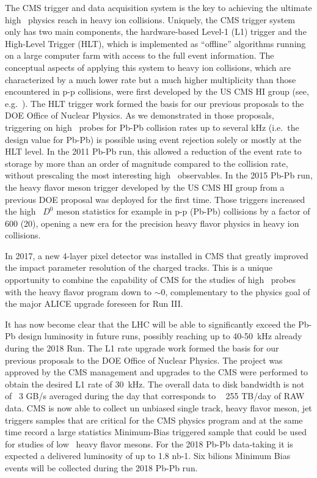 The CMS trigger and data acquisition system is the key to achieving the ultimate high \pt\ physics reach in heavy ion collisions. Uniquely, the CMS trigger system only has two main components, the hardware-based Level-1 (L1) trigger and the High-Level Trigger (HLT), which is implemented as ``offline'' algorithms running on a large computer farm with access to the full event information.  
The conceptual aspects of applying this system to heavy ion collisions, which are characterized by a much lower rate but a much higher multiplicity than those encountered in p-p collisions, were first developed by the US CMS HI group (see, e.g.\ \cite{Roland:2007is}). The HLT trigger work formed the basis for our previous proposals to the DOE Office of Nuclear Physics. As we demonstrated in those proposals, triggering on high \pt\ probes for Pb-Pb collision rates up to several kHz (i.e.\ the design value for Pb-Pb) is possible using event rejection solely or mostly at the HLT level. In the 2011 Pb-Pb run, this allowed a reduction of the event rate to storage by more than an order of magnitude compared to the collision rate, without prescaling the most interesting high \pt\ observables. In the 2015 Pb-Pb run, the heavy flavor meson trigger developed by the US CMS HI group from a previous DOE proposal was deployed for the first time. Those triggers increased the high \pt\ $D^0$ meson statistics for example in p-p (Pb-Pb) collisions by a factor of 600 (20), opening a new era for the precision heavy flavor physics in heavy ion collisions.

In 2017, a new 4-layer pixel detector was installed in CMS that greatly improved the impact parameter resolution of the charged tracks. This is a unique opportunity to combine the capability of CMS for the studies of high \pt\ probes with the heavy flavor program down to \pt$\sim 0$, complementary to the physics goal of the major ALICE upgrade foreseen for Run III. 

It has now become clear that the LHC will be able to significantly exceed the Pb-Pb design luminosity in future runs, possibly reaching up to 40-50~kHz already during the 2018 Run.
The L1 rate upgrade work formed the basis for our previous proposals to the DOE Office of Nuclear Physics. The project was approved by the CMS management and upgrades to the CMS were performed to obtain the desired L1 rate of 30~kHz. The overall data to disk bandwidth is not of ~3 GB/s averaged during the day that corresponds to ~ 255 TB/day of RAW data.  CMS is now able to collect un unbiased single track, heavy flavor meson, jet triggers samples that are critical for the CMS physics program and at the same time record a large statistics Minimum-Bias triggered sample that could be used for studies of low \pt\ heavy flavor mesons. For the 2018 Pb-Pb data-taking it is expected a delivered luminosity of up to 1.8 nb-1. Six bilions Minimum Bias events will be collected during the 2018 Pb-Pb run.   

